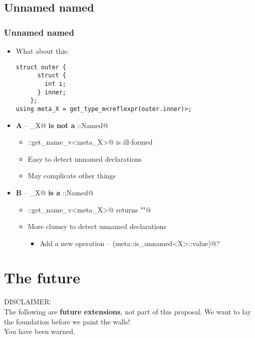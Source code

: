 \documentclass[compress,table,xcolor=table]{beamer}
\begin{document}
\subsection{Unnamed named}
\begin{frame}[fragile]
\frametitle{Unnamed named}
  \begin{itemize}
    \item What about this:
    \begin{lstlisting}[basicstyle=\footnotesize\ttfamily]
	struct outer {
	  struct {
	    int i;
	  } inner;
	};
using meta_X = get_type_m<reflexpr(outer.inner)>;
    \end{lstlisting}
    \item {\bf A} -- \verb@meta_X@ \textbf{is not a} \verb@meta::Named@
    \begin{itemize}
      \small
      \item \verb@meta::get_name_v<meta_X>@ is ill-formed
      \item Easy to detect unnamed declarations
      \item May complicate other things
    \end{itemize}
    \item {\bf B} -- \verb@meta_X@ \textbf{is a} \verb@meta::Named@
    \begin{itemize}
      \small
      \item \verb@meta::get_name_v<meta_X>@ returns \verb@""@
      \item More clumsy to detect unnamed declarations
      \begin{itemize}
        \item Add a new operation -- \verb@bool(meta::is_unnamed<X>::value)@?
      \end{itemize}
    \end{itemize}
  \end{itemize}
\end{frame}

\section{The future}

\begin{frame}
\begin{center}
\Huge \alert{DISCLAIMER:}\\
\Large The following are \textbf{future extensions}, not part of this
proposal. We want to lay the foundation before we paint the walls!\\
\normalsize
\vspace{2em}
You have been warned.
\end{center}
\end{frame}
\end{document}
